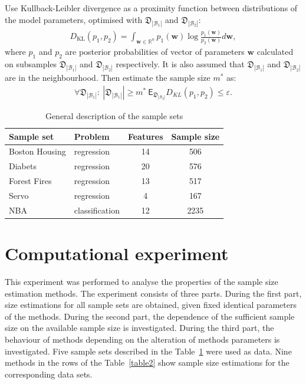 \documentclass[
11pt,%
tightenlines,%
twoside,%
onecolumn,%
nofloats,%
nobibnotes,%
nofootinbib,%
superscriptaddress,%
noshowpacs,%
centertags]%
{revtex4}
\begin{document}
Use Kullback-Leibler divergence as a proximity function between distributions of the model parameters, optimised with $\mathfrak{D}_{|\mathcal{B}_1|}$ and $\mathfrak{D}_{|\mathcal{B}_2|}$:
\[
\label{eq:bs:9}
\begin{aligned}
	D_\text{KL}\left(p_1, p_2\right) = \int_{\textbf{w}\in\mathbb{R}^{n}}p_1(\textbf{w})\log\frac{p_1(\textbf{w})}{p_2(\textbf{w})}d\textbf{w},
\end{aligned}
\]
where $p_1$ and $p_2$ are posterior probabilities of vector of parameters $\textbf{w}$ calculated on subsamples $\mathfrak{D}_{|\mathcal{B}_1|}$ and $\mathfrak{D}_{|\mathcal{B}_2|}$ respectively. It is also assumed that $\mathfrak{D}_{|\mathcal{B}_1|}$ and $\mathfrak{D}_{|\mathcal{B}_2|}$ are in the neighbourhood.
Then estimate the sample size $m^*$ as:
\[
\label{eq:bs:10}
\begin{aligned}
	\forall \mathfrak{D}_{|\mathcal{B}_1|}:~\left|\mathfrak{D}_{|\mathcal{B}_1|}\right| \geq m^*  ~ \mathsf{E}_{\mathfrak{D}_{|\mathcal{B}_2|}}D_{KL}\left(p_1, p_2\right) \leq \varepsilon.
\end{aligned}
\]

\begin{table}[!htp]
\centering
\caption{General description of the sample sets}
\label{table20}
\begin{tabular}{|l|l|c|c|}
\hline
	\centering Sample set & Problem & Features & Sample size\\ \hline
	\hline 	Boston Housing 	&regression		&14 & 506\\
	\hline	Diabets  				& regression		&20  & 576\\
	\hline	Forest Fires 			& regression		& 13 & 517\\
  	\hline	Servo 					& regression 	& 4   & 167\\
	\hline	NBA				 		& classification	& 12 & 2235\\
\hline
\end{tabular}
\end{table} 
	  
\section{Computational experiment}
This experiment was performed to analyse the properties of the sample size estimation methods. The experiment consists of three parts. During the first part, size estimations for all sample sets are obtained, given fixed identical parameters of the methods. During the second part, the dependence of the sufficient sample size on the available sample size is investigated. During the third part, the behaviour of methods depending on the alteration of methods parameters is investigated. Five sample sets described in the Table~\ref{table20} were used as data. Nine methods in the rows of the  Table~\ref{table2} show sample size estimations for the corresponding data sets. 
 
\end{document}
